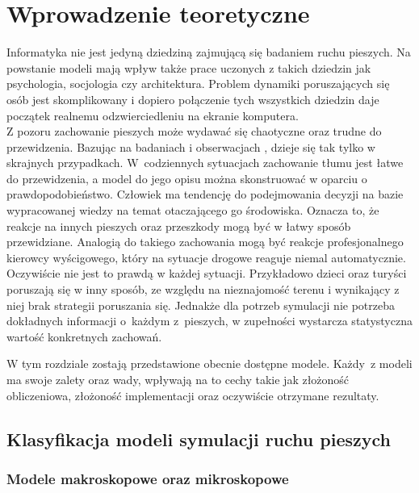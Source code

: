 \chapter{Wprowadzenie teoretyczne}
\label{cha:wprowadzenieTeoretyczne}

Informatyka nie jest jedyną dziedziną zajmującą się badaniem ruchu pieszych. Na powstanie modeli mają wpływ także prace uczonych z takich dziedzin jak psychologia, socjologia czy architektura. Problem dynamiki poruszających się osób jest skomplikowany i dopiero połączenie tych wszystkich dziedzin daje początek realnemu odzwierciedleniu na ekranie komputera. \\
Z pozoru zachowanie pieszych może wydawać się chaotyczne oraz trudne do przewidzenia. Bazując na badaniach i obserwacjach \cite{SforceModelForPedDyn}, dzieje się tak tylko w skrajnych przypadkach. W~codziennych sytuacjach zachowanie tłumu jest łatwe do przewidzenia, a model do jego opisu można skonstruować w oparciu o prawdopodobieństwo. Człowiek ma tendencję do podejmowania decyzji na bazie wypracowanej wiedzy na temat otaczającego go środowiska. Oznacza to, że reakcje na innych pieszych oraz przeszkody mogą być w łatwy sposób przewidziane. Analogią do takiego zachowania mogą być reakcje profesjonalnego kierowcy wyścigowego, który na sytuacje drogowe reaguje niemal automatycznie.\\

Oczywiście nie jest to prawdą w każdej sytuacji. Przykładowo dzieci oraz turyści poruszają się w inny sposób, ze względu na nieznajomość terenu i wynikający z niej brak strategii poruszania się. Jednakże dla potrzeb symulacji nie potrzeba dokładnych informacji o~każdym z~pieszych, w zupełności wystarcza statystyczna wartość konkretnych zachowań.

W tym rozdziale zostają przedstawione obecnie dostępne modele. Każdy~z modeli ma swoje zalety oraz wady, wpływają na to cechy takie jak złożoność obliczeniowa, złożoność implementacji oraz oczywiście  otrzymane rezultaty.

\section{Klasyfikacja modeli symulacji ruchu pieszych}
\label{sec:klasyfikacja}

\subsection{Modele makroskopowe oraz mikroskopowe}

